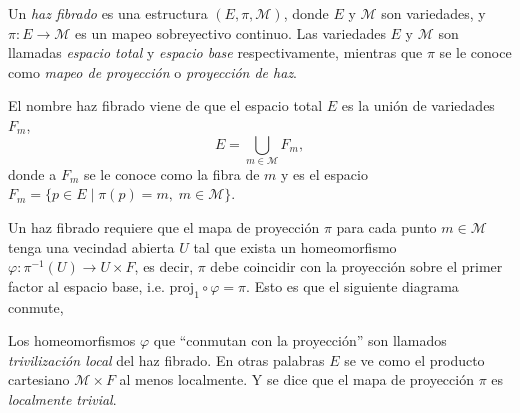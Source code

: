 
\begin{mydef}
Un \emph{haz fibrado} es una estructura $(E, \pi, \mathcal{M})$, donde $E$ y $\mathcal{M}$ son variedades, y $\pi: E \longrightarrow \mathcal{M}$ es un mapeo sobreyectivo continuo. Las variedades $E$ y $\mathcal{M}$ son llamadas \emph{espacio total} y \emph{espacio base} respectivamente, mientras que $\pi$ se le conoce como \emph{mapeo de proyecci\'{o}n} o \emph{proyecci\'{o}n de haz}.
%
\begin{center}
\end{center}
%
\end{mydef}

El nombre haz fibrado viene de que el espacio total $E$ es la uni\'{o}n de variedades $F_{m}$, $$E = \bigcup\limits_{m \in \mathcal{M}} F_{m},$$ donde a $F_{m}$ se le conoce como la fibra de $m$ y es el espacio $F_{m} = \{p \in E \; \vert \; \pi(p) = m, \; m \in \mathcal{M}\}$.

Un haz fibrado requiere que el mapa de proyecci\'{o}n $\pi$ para cada punto $m \in \mathcal{M}$ tenga una vecindad abierta $U$ tal que exista un homeomorfismo $\varphi: \pi^{-1}(U) \longrightarrow U \times F$, es decir, $\pi$ debe coincidir con la proyecci\'{o}n sobre el primer factor al espacio base, i.e. $\mathrm{proj_{1}} \circ \varphi = \pi$. Esto es que el siguiente diagrama conmute,
%
\begin{center}
\end{center}

Los homeomorfismos $\varphi$ que ``conmutan con la proyecci\'{o}n'' son llamados \emph{trivilizaci\'{o}n local} del haz fibrado. En otras palabras $E$ se ve como el producto cartesiano $\mathcal{M} \times F$ al menos localmente. Y se dice que el mapa de proyecci\'{o}n $\pi$ es \emph{localmente trivial}.

